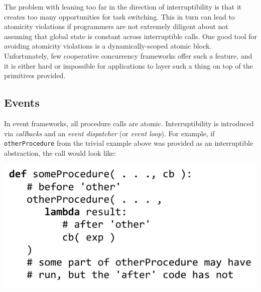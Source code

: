 \documentclass[9pt,preprint]{sigplanconf}
\begin{document}
The problem with leaning too far in the direction of interruptibility is that it creates too many opportunities for task switching.
This in turn can lead to atomicity violations if programmers are not extremely diligent about not assuming that global state is constant across interruptible calls.
One good tool for avoiding atomicity violations is a dynamically-scoped atomic block.
Unfortunately, few cooperative concurrency frameworks offer such a feature, and it is either hard or impossible for applications to layer such a thing on top of the primitives provided.

\subsection{Events}


In event frameworks, all procedure calls are atomic.
Interruptibility is introduced via \emph{callbacks} and an \emph{event dispatcher} (or \emph{event loop}).
For example, if \texttt{otherProcedure} from the trivial example above was provided as an interruptible abstraction, the call would look like:

\noindent
\includegraphics[scale=0.7]{trivial_call_event}
\end{document}
